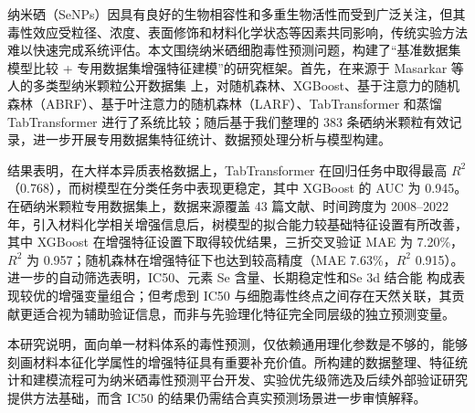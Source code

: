 纳米硒（SeNPs）因具有良好的生物相容性和多重生物活性而受到广泛关注，但其毒性效应受粒径、浓度、表面修饰和材料化学状态等因素共同影响，传统实验方法难以快速完成系统评估。本文围绕纳米硒细胞毒性预测问题，构建了“基准数据集模型比较 + 专用数据集增强特征建模”的研究框架。首先，在来源于 Masarkar 等人的多类型纳米颗粒公开数据集 \cite{masarkar2024} 上，对随机森林、XGBoost、基于注意力的随机森林（ABRF）、基于叶注意力的随机森林（LARF）、TabTransformer 和蒸馏 TabTransformer 进行了系统比较；随后基于我们整理的 383 条硒纳米颗粒有效记录，进一步开展专用数据集特征统计、数据预处理分析与模型构建。

结果表明，在大样本异质表格数据上，TabTransformer 在回归任务中取得最高 $R^2$（0.768），而树模型在分类任务中表现更稳定，其中 XGBoost 的 AUC 为 0.945。在硒纳米颗粒专用数据集上，数据来源覆盖 43 篇文献、时间跨度为 2008--2022 年，引入材料化学相关增强信息后，树模型的拟合能力较基础特征设置有所改善，其中 XGBoost 在增强特征设置下取得较优结果，三折交叉验证 MAE 为 7.20\%，$R^2$ 为 0.957；随机森林在增强特征下也达到较高精度（MAE 7.63\%，$R^2$ 0.915）。进一步的自动筛选表明，IC50、元素 Se 含量、长期稳定性和Se 3d 结合能 构成表现较优的增强变量组合；但考虑到 IC50 与细胞毒性终点之间存在天然关联，其贡献更适合视为辅助验证信息，而非与先验理化特征完全同层级的独立预测变量。

本研究说明，面向单一材料体系的毒性预测，仅依赖通用理化参数是不够的，能够刻画材料本征化学属性的增强特征具有重要补充价值。所构建的数据整理、特征统计和建模流程可为纳米硒毒性预测平台开发、实验优先级筛选及后续外部验证研究提供方法基础，而含 IC50 的结果仍需结合真实预测场景进一步审慎解释。
